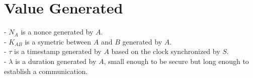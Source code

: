 \section{Value Generated}

- $N_A$ is a nonce generated by $A$. \\
- $K_{AB}$ is a symetric between $A$ and $B$ generated by $A$. \\
- $\tau$ is a timestamp generated by $A$ based on the clock synchronized by $S$. \\
- $\lambda$ is a duration generated by $A$, small enough to be secure but long enough to establish a communication. \\
